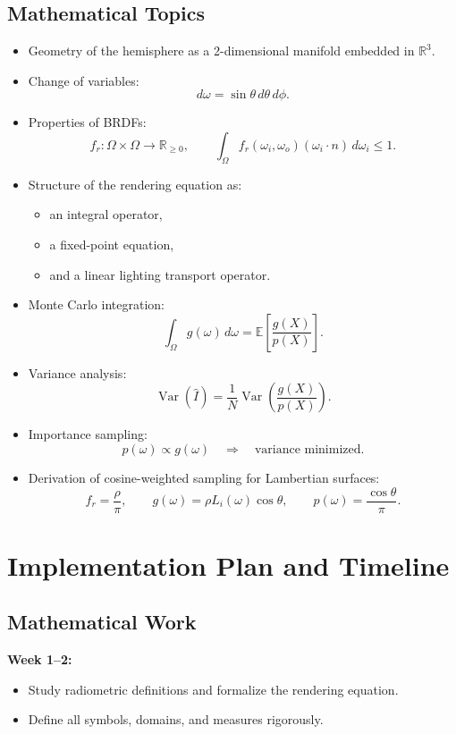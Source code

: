 \documentclass[12pt]{article}
\begin{document}
\subsection*{Mathematical Topics}
\begin{itemize}
    \item Geometry of the hemisphere as a 2-dimensional manifold embedded in $\mathbb{R}^3$.
    \item Change of variables:
    \[
    d\omega = \sin\theta\, d\theta\, d\phi.
    \]
    \item Properties of BRDFs:
    \[
    f_r: \Omega \times \Omega \to \mathbb{R}_{\ge 0}, \qquad
    \int_{\Omega} f_r(\omega_i,\omega_o)(\omega_i\cdot n)\, d\omega_i \le 1.
    \]
    \item Structure of the rendering equation as:
    \begin{itemize}
        \item an integral operator,
        \item a fixed-point equation,
        \item and a linear lighting transport operator.
    \end{itemize}
    \item Monte Carlo integration:
    \[
    \int_{\Omega} g(\omega)\, d\omega 
    = \mathbb{E}\left[\frac{g(X)}{p(X)}\right].
    \]
    \item Variance analysis:
    \[
    \operatorname{Var}(\hat{I})
    = \frac{1}{N}\operatorname{Var}\!\left(\frac{g(X)}{p(X)}\right).
    \]
    \item Importance sampling:
    \[
    p(\omega)\propto g(\omega)
    \quad\Rightarrow\quad
    \text{variance minimized}.
    \]
    \item Derivation of cosine-weighted sampling for Lambertian surfaces:
    \[
    f_r = \frac{\rho}{\pi},\qquad
    g(\omega)=\rho L_i(\omega)\cos\theta,
    \qquad
    p(\omega)=\frac{\cos\theta}{\pi}.
    \]
\end{itemize}



\section{Implementation Plan and Timeline}

\subsection*{Mathematical Work}
\textbf{Week 1–2:}
\begin{itemize}
    \item Study radiometric definitions and formalize the rendering equation.
    \item Define all symbols, domains, and measures rigorously.
\end{itemize}
\end{document}
